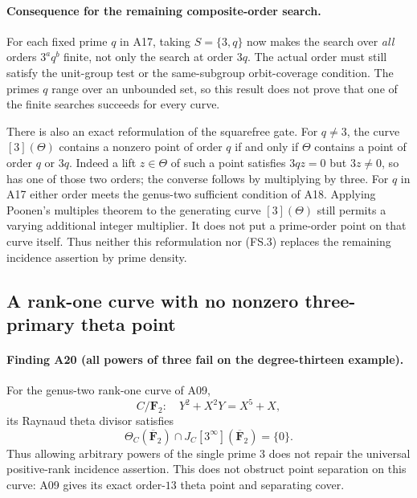 \documentclass[11pt,a4paper]{article}
\begin{document}
\paragraph{Consequence for the remaining composite-order search.}
For each fixed prime $q$ in A17, taking $S=\{3,q\}$ now makes
the search over \emph{all} orders $3^a q^b$ finite, not only
the search at order $3q$. The actual order must still satisfy
the unit-group test or the same-subgroup orbit-coverage condition.
The primes $q$ range over an unbounded set, so this result does
not prove that one of the finite searches succeeds for every
curve.

There is also an exact reformulation of the squarefree gate.
For $q\ne3$, the curve $[3](\Theta)$ contains a nonzero point
of order $q$ if and only if $\Theta$ contains a point of order
$q$ or $3q$. Indeed a lift $z\in\Theta$ of such a point
satisfies $3qz=0$ but $3z\ne0$, so has one of those two orders;
the converse follows by multiplying by three.
For $q$ in A17 either order meets the genus-two sufficient
condition of A18. Applying Poonen's multiples theorem to the
generating curve $[3](\Theta)$ still permits a varying additional
integer multiplier. It does not put a prime-order point on that
curve itself. Thus neither this reformulation nor (FS.3)
replaces the remaining incidence assertion by prime density.


\subsection{A rank-one curve with no nonzero three-primary theta point}
\label{sec:no-three-primary-theta}

\paragraph{Finding A20 (all powers of three fail on the degree-thirteen example).}
For the genus-two rank-one curve of A09,
\[
 C/\mathbf F_2:\quad Y^2+X^2Y=X^5+X,
\]
its Raynaud theta divisor satisfies
\[
       \Theta_C(\overline{\mathbf F}_2)
          \cap J_C[3^\infty](\overline{\mathbf F}_2)=\{0\}.
 \tag{TP.1}
\]
Thus allowing arbitrary powers of the single prime $3$ does not
repair the universal positive-rank incidence assertion. This does
not obstruct point separation on this curve: A09 gives its exact
order-$13$ theta point and separating cover.
\end{document}
